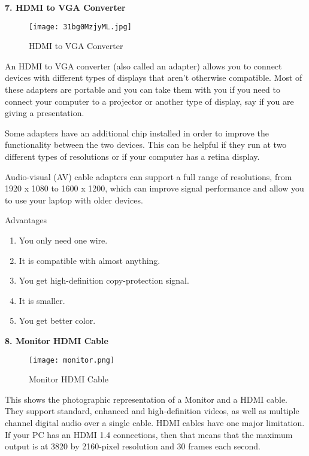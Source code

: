 \documentclass[12pt,a4paper]{report}
\begin{document}
\noindent 

\noindent 

\noindent\textbf{7. HDMI to VGA Converter }

\begin{figure}[htp]
    \texttt{[image: 31bg0MzjyML.jpg]}
    \caption{HDMI to VGA Converter }
\end{figure}
\noindent 

\noindent An HDMI to VGA converter (also called an adapter) allows you to connect devices with different types of displays that aren't otherwise compatible. Most of these adapters are portable and you can take them with you if you need to connect your computer to a projector or another type of display, say if you are giving a presentation.

\noindent Some adapters have an additional chip installed in order to improve the functionality between the two devices. This can be helpful if they run at two different types of resolutions or if your computer has a retina display.

\noindent Audio-visual (AV) cable adapters can support a full range of resolutions, from 1920 x 1080 to 1600 x 1200, which can improve signal performance and allow you to use your laptop with older devices.

\noindent Advantages 

\begin{enumerate}
\item  You only need one wire. 

\item  It is compatible with almost anything. 

\item  You get high-definition copy-protection signal. 

\item  It is smaller. 

\item  You get better color. 
\end{enumerate}

\noindent 

\noindent\textbf{8. Monitor HDMI Cable }



\begin{figure}[htp]
    \texttt{[image: monitor.png]}
    \caption{ Monitor HDMI Cable }
\end{figure}

\noindent \textbf{}

\noindent This shows the photographic representation of a Monitor and a HDMI cable. They support standard, enhanced and high-definition videos, as well as multiple channel digital audio over a single cable. HDMI cables have one major limitation. If your PC has an HDMI 1.4 connections, then that means that the maximum output is at 3820 by 2160-pixel resolution and 30 frames each second.
\end{document}
